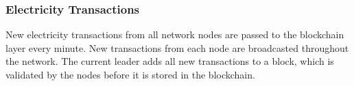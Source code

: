 \subsubsection*{Electricity Transactions}
New electricity transactions from all network nodes are passed to the blockchain layer every minute. New transactions from each node are broadcasted throughout the network. The current leader adds all new transactions to a block, which is validated by the nodes before it is stored in the blockchain. 


\newpage







